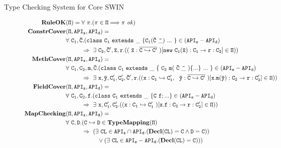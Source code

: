 \begin{section}{Type Checking System for Core SWIN}
\begin{figure*}
\begin{align*}
\tt \mathbf{RuleOK} &\tt(\Pi) = \forall~\pi. (\pi\in\Pi \Longrightarrow \pi~\mathit{ok})\\
\tt \mathbf{ConstrCover}&\tt(\Pi, API_s, API_d) =\\
                  &\tt \forall~C_1,\bar{C}. (class\ C_1\ extends\ \_~\{ C_1(\bar{C}\ \bar{\_})~...~\}\in (API_s-API_d) \\
                  &\tt \indentspace\Rightarrow~ \exists~C_2,\bar{C}',\bar{x},r.((~\bar{x}:\overline{C\hookrightarrow C'}~)[new\ C_1(\bar{x}):C_1\rightarrow r:C_2]\in\Pi))\\
\tt \mathbf{MethCover}&\tt(\Pi, API_s, API_d) =\\ 
                  &\tt \forall~C_1,C_2,m,\bar{C}.(class\ C_1\ extends\ \_~\{~C_2\ m(~\bar{C}\ \bar{\_}~)\{...\}~...~\}\in (API_s-API_d) \\
                  &\tt \indentspace\Rightarrow~ \exists~x,\bar{y},C'_1,C'_2,\bar{C}',r.((x:C_1\hookrightarrow C'_1,\ ~\bar{y}:\overline{C\hookrightarrow C'}~)[x.m(\bar{y}):C_2\rightarrow r:C'_2] \in \Pi))\\
\tt \mathbf{FieldCover}&\tt(\Pi, API_s, API_d) =\\ 
                  &\tt \forall~C_1,C_2,f.(class\ C_1\ extends\ \_~\{C\ f;...\}\in (API_s-API_d) \\
                  &\tt \indentspace \Rightarrow~ \exists~x,C'_1,C'_2.((x:C_1\hookrightarrow C'_1~)[x.f:C_2\rightarrow r:C'_2] \in \Pi))                           \\
\tt \mathbf{MapChecking}&\tt(\Pi, API_s, API_d) =\\
                  &\tt \forall~C,D.(C\hookrightarrow D\in \mathbf{TypeMapping}(\Pi)\\
                  &\tt \indentspace\Rightarrow~ (\exists~CL\in API_s \cap API_d. (\mathbf{Decl}(CL)=C \land D = C))\\
                  &\tt \indentspace\indentspace \lor (\exists~CL\in API_s-API_d. (\mathbf{Decl}(CL)=C)))\\

\end{align*}
\end{figure*}
\end{section}
